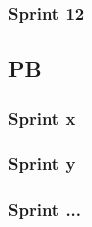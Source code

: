 \documentclass{article}
\begin{document}
            \subsubsection{Sprint 12}
        \subsection{PB}
            \subsubsection{Sprint x}
            \subsubsection{Sprint y}
            \subsubsection{Sprint ...}

\end{document}
